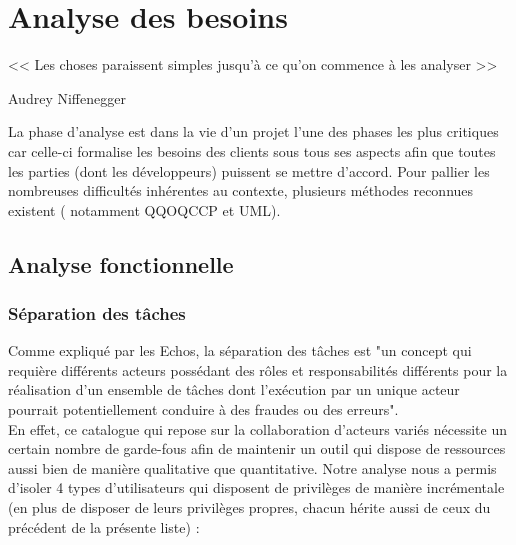 
\chapter{Analyse des besoins}

\epigraph{<< Les choses paraissent simples jusqu'à ce qu'on commence à les analyser >>}{Audrey Niffenegger}

La phase d'analyse est dans la vie d'un projet l'une des phases les plus critiques car celle-ci formalise les besoins des clients sous tous ses aspects afin que toutes les parties (dont les développeurs) puissent se mettre d'accord. Pour pallier les nombreuses difficultés inhérentes au contexte, plusieurs méthodes reconnues existent ( notamment \Gls{QQOQCCP} et UML).



\section{Analyse fonctionnelle}

\subsection*{Séparation des tâches}

Comme expliqué par les Echos\cite{SOD}, la séparation des tâches est "un concept qui requière différents acteurs possédant des rôles et responsabilités différents pour la réalisation d’un ensemble de tâches dont l’exécution par un unique acteur pourrait potentiellement conduire à des fraudes ou des erreurs". \\


En effet, ce catalogue qui repose sur la collaboration d'acteurs variés nécessite un certain nombre de garde-fous afin de maintenir un outil qui dispose de ressources aussi bien de manière qualitative que quantitative. Notre analyse nous a permis d'isoler 4 types d'utilisateurs qui disposent de privilèges de manière incrémentale (en plus de disposer de leurs privilèges propres, chacun hérite aussi de ceux du précédent de la présente liste) :

